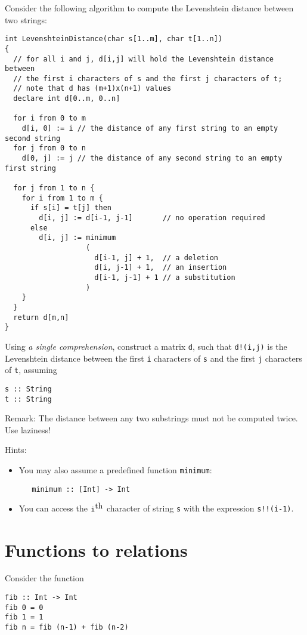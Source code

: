 \documentclass{article}
\begin{document}
Consider the following algorithm to compute the Levenshtein distance between two strings:
{\small
\begin{verbatim}
int LevenshteinDistance(char s[1..m], char t[1..n])
{
  // for all i and j, d[i,j] will hold the Levenshtein distance between
  // the first i characters of s and the first j characters of t;
  // note that d has (m+1)x(n+1) values
  declare int d[0..m, 0..n]

  for i from 0 to m
    d[i, 0] := i // the distance of any first string to an empty second string
  for j from 0 to n
    d[0, j] := j // the distance of any second string to an empty first string

  for j from 1 to n {
    for i from 1 to m {
      if s[i] = t[j] then
        d[i, j] := d[i-1, j-1]       // no operation required
      else
        d[i, j] := minimum
                   (
                     d[i-1, j] + 1,  // a deletion
                     d[i, j-1] + 1,  // an insertion
                     d[i-1, j-1] + 1 // a substitution
                   )
    }
  }
  return d[m,n]
}
\end{verbatim}
}

Using \emph{a single comprehension}, construct a matrix \texttt{d},
such that \texttt{d!(i,j)} is the Levenshtein distance between the
first \texttt{i} characters of \texttt{s} and the first \texttt{j}
characters of \texttt{t}, assuming
\begin{verbatim}
s :: String
t :: String
\end{verbatim}

Remark: The distance between any two substrings must not be computed
twice. Use laziness!

Hints:
\begin{itemize}
\item You may also assume a predefined function \texttt{minimum}:
\begin{verbatim}
   minimum :: [Int] -> Int
\end{verbatim}
\item You can access the $\mbox{\texttt{i}}^{\mbox{th}}$ character of
  string \texttt{s} with the expression \texttt{s!!(i-1)}.
\end{itemize}

\section{Functions to relations}

Consider the function
\begin{verbatim}
fib :: Int -> Int
fib 0 = 0
fib 1 = 1
fib n = fib (n-1) + fib (n-2)
\end{verbatim}
\end{document}
